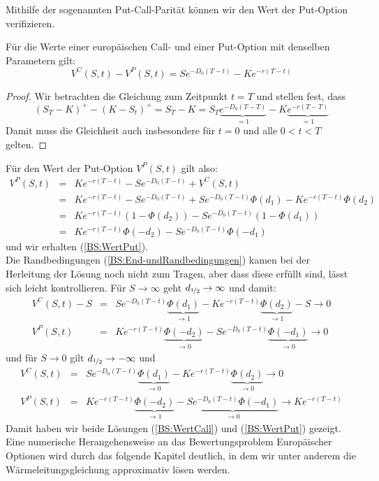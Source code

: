 Mithilfe der sogenannten Put-Call-Parität können wir den Wert der Put-Option verifizieren.
\begin{satz}\label{BS:PutCallParitaet}
Für die Werte einer europäischen Call- und einer Put-Option mit denselben Parametern gilt:
\begin{equation*}
V^C(S,t) - V^P(S,t) = Se^{-D_0(T-t)} - Ke^{-r(T-t)}
\end{equation*}
\end{satz}
\begin{proof}
Wir betrachten die Gleichung zum Zeitpunkt $t=T$ und stellen fest, dass
\begin{equation*}
\left(S_T-K\right)^+ - \left(K-S_t\right)^+ = S_T - K = S_T\underbrace{e^{-D_0(T-T)}}_{=1} - K\underbrace{e^{-r(T-T)}}_{=1}
\end{equation*}
Damit muss die Gleichheit auch insbesondere für $t=0$ und alle $0<t<T$ gelten.
\end{proof}
Für den Wert der Put-Option $V^P(S,t)$ gilt also:
\begin{eqnarray*}
V^P(S,t) & = & Ke^{-r(T-t)} - Se^{-D_0(T-t)} + V^C(S,t) \\
         & = & Ke^{-r(T-t)} - Se^{-D_0(T-t)} + Se^{-D_0(T-t)}\Phi\left(d_1\right) - Ke^{-r(T-t)}\Phi\left(d_2\right) \\
         & = & Ke^{-r(T-t)}\left(1-\Phi\left(d_2\right)\right) - Se^{-D_0(T-t)}\left(1-\Phi\left(d_1\right)\right) \\
         & = & Ke^{-r(T-t)}\Phi\left(-d_2\right) - Se^{-D_0(T-t)}\Phi\left(-d_1\right)
\end{eqnarray*}
und wir erhalten (\ref{BS:WertPut}). \\
Die Randbedingungen (\ref{BS:End-undRandbedingungen}) kamen bei der Herleitung der Lösung noch nicht zum Tragen, aber dass diese erfüllt sind, lässt sich leicht kontrollieren. Für $S\to\infty$ geht $d_{\nicefrac{1}{2}} \to \infty$ und damit:
\begin{eqnarray*}
V^C(S,t) - S & = & Se^{-D_0(T-t)}\underbrace{\Phi\left(d_1\right)}_{\to 1} - Ke^{-r(T-t)}\underbrace{\Phi\left(d_2\right)}_{\to 1} - S  \to  0 \\
V^P(S,t) & = & Ke^{-r(T-t)}\underbrace{\Phi\left(-d_2\right)}_{\to 0} - Se^{-D_0(T-t)}\underbrace{\Phi\left(-d_1\right)}_{\to 0} \to 0
\end{eqnarray*}
und für $S \to 0$ gilt $d_{\nicefrac{1}{2}} \to -\infty$ und
\begin{eqnarray*}
V^C(S,t) & = & Se^{-D_0(T-t)}\underbrace{\Phi\left(d_1\right)}_{\to 0} - Ke^{-r(T-t)}\underbrace{\Phi\left(d_2\right)}_{\to 0}  \to  0 \\
V^P(S,t) & = & Ke^{-r(T-t)}\underbrace{\Phi\left(-d_2\right)}_{\to 1} - \underbrace{Se^{-D_0(T-t)}\Phi\left(-d_1\right)}_{\to 0} \to Ke^{-r(T-t)}
\end{eqnarray*}
Damit haben wir beide Lösungen (\ref{BS:WertCall}) und (\ref{BS:WertPut}) gezeigt.
Eine numerische Herangehensweise an das Bewertungsproblem Europäischer Optionen wird durch das folgende Kapitel deutlich, in dem wir unter anderem die Wärmeleitungsgleichung approximativ lösen werden.






